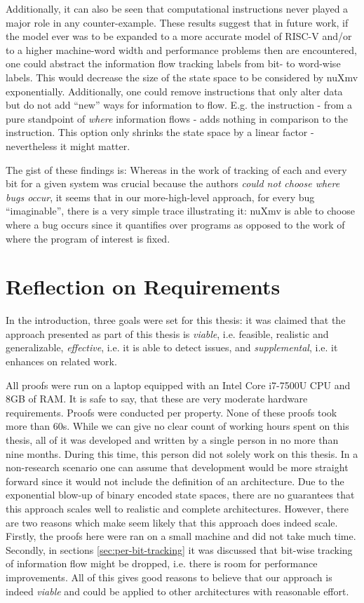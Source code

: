 Additionally, it can also be seen that computational instructions never played a major role in any counter-example.
These results suggest that in future work, if the model ever was to be expanded to a more accurate model of RISC-V and/or to a higher machine-word width and performance problems then are encountered, one could abstract the information flow tracking labels from bit- to word-wise labels.
This would decrease the size of the state space to be considered by nuXmv exponentially.
Additionally, one could remove instructions that only alter data but do not add \enquote{new} ways for information to flow.
E.g. the  instruction - from a pure standpoint of \textit{where} information flows - adds nothing in comparison to the  instruction.
This option only shrinks the state space by a linear factor - nevertheless it might matter.

The gist of these findings is:
Whereas in the work of \citeauthor{Ferraiuolo17} \cite{Ferraiuolo17} tracking of each and every bit for a given system was crucial because the authors \textit{could not choose where bugs occur}, it seems that in our more-high-level approach, for every bug \enquote{imaginable}, there is a very simple trace illustrating it: nuXmv is able to choose where a bug occurs since it quantifies over programs as opposed to the work of \citeauthor{Ferraiuolo17} where the program of interest is fixed.

\section{Reflection on Requirements}
\label{sec:discuss-requirements}

In the introduction, three goals were set for this thesis: it was claimed that the approach presented as part of this thesis is \textit{viable}, i.e. feasible, realistic and generalizable, \textit{effective}, i.e. it is able to detect issues, and \textit{supplemental}, i.e. it enhances on related work.

All proofs were run on a laptop equipped with an Intel Core i7-7500U CPU and 8GB of RAM.
It is safe to say, that these are very moderate hardware requirements.
Proofs were conducted per property.
None of these proofs took more than 60s.
While we can give no clear count of working hours spent on this thesis, all of it was developed and written by a single person in no more than nine months.
During this time, this person did not solely work on this thesis.
In a non-research scenario one can assume that development would be more straight forward since it would not include the definition of an architecture.
Due to the exponential blow-up of binary encoded state spaces, there are no guarantees that this approach scales well to realistic and complete architectures.
However, there are two reasons which make seem likely that this approach does indeed scale.
Firstly, the proofs here were ran on a small machine and did not take much time.
Secondly, in sections \ref{sec:per-bit-tracking} it was discussed that bit-wise tracking of information flow might be dropped, i.e. there is room for performance improvements.
All of this gives good reasons to believe that our approach is indeed \textit{viable} and could be applied to other architectures with reasonable effort.

